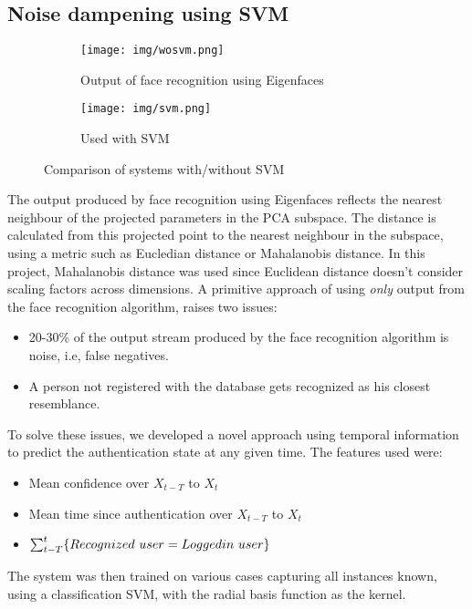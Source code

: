 \documentclass[12pt]{article}			%
\begin{document}
\subsection{Noise dampening using SVM}
\begin{figure}[h!]
        \begin{subfigure}[b]{0.6\textwidth}
                \centering
                \texttt{[image: img/wosvm.png]}
                \caption{Output of face recognition using Eigenfaces}
                \label{fig:svm1}
        \end{subfigure}%
        \begin{subfigure}[b]{0.5\textwidth}
                \centering
                \texttt{[image: img/svm.png]}
                \caption{Used with SVM}
                \label{fig:svm2}
        \end{subfigure}
        \caption{Comparison of systems with/without SVM}\label{fig:pwd}
\end{figure}
The output produced by face recognition using Eigenfaces reflects the nearest neighbour of the projected parameters in the PCA subspace.
The distance is calculated from this projected point to the nearest neighbour in the subspace, using a metric such as Eucledian distance or Mahalanobis distance.
In this project, Mahalanobis distance was used since Euclidean distance doesn't consider scaling factors across dimensions. 
A primitive approach of using \emph{only} output from the face recognition algorithm, raises two issues:
\begin{itemize}
	\item 20-30\% of the output stream produced by the face recognition algorithm is noise, i.e, false negatives.
	\item A person not registered with the database gets recognized as his closest resemblance.
\end{itemize}
To solve these issues, we developed a novel approach using temporal information to predict the authentication state at any given time.
The features used were:
\begin{itemize}
	\item Mean confidence over $X_{t-T}$ to $X_{t}$
	\item Mean time since authentication over $X_{t-T}$ to $X_{t}$
	\item $\sum _{t-T}^{t}\{Recognized\ user = Logged\-in\ user\}$
\end{itemize}
The system was then trained on various cases capturing all instances known, using a classification SVM, with the radial basis function as the kernel.
   
\end{document}
